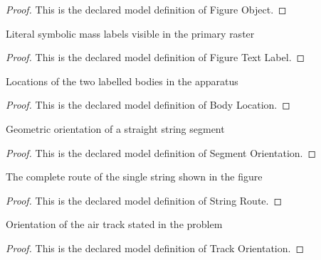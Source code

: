 \begin{proof}
  This is the declared model definition of Figure Object.
\end{proof}
\begin{definition}
  \label{def:physics:phyx-mini-0805:phyxminiproblems-problemphyxmini0805-figuretextlabel}
  Literal symbolic mass labels visible in the primary raster
\end{definition}
\begin{proof}
  This is the declared model definition of Figure Text Label.
\end{proof}
\begin{definition}
  \label{def:physics:phyx-mini-0805:phyxminiproblems-problemphyxmini0805-bodylocation}
  Locations of the two labelled bodies in the apparatus
\end{definition}
\begin{proof}
  This is the declared model definition of Body Location.
\end{proof}
\begin{definition}
  \label{def:physics:phyx-mini-0805:phyxminiproblems-problemphyxmini0805-segmentorientation}
  Geometric orientation of a straight string segment
\end{definition}
\begin{proof}
  This is the declared model definition of Segment Orientation.
\end{proof}
\begin{definition}
  \label{def:physics:phyx-mini-0805:phyxminiproblems-problemphyxmini0805-stringroute}
  The complete route of the single string shown in the figure
\end{definition}
\begin{proof}
  This is the declared model definition of String Route.
\end{proof}
\begin{definition}
  \label{def:physics:phyx-mini-0805:phyxminiproblems-problemphyxmini0805-trackorientation}
  Orientation of the air track stated in the problem
\end{definition}
\begin{proof}
  This is the declared model definition of Track Orientation.
\end{proof}
